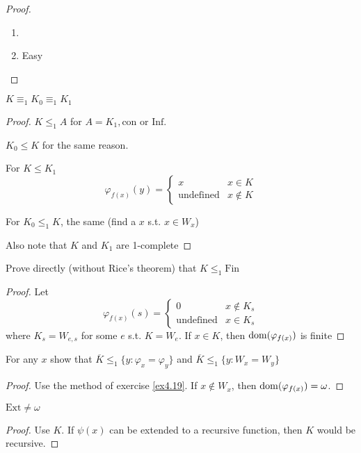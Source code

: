 \documentclass[11pt]{article}
\begin{document}
\begin{proof}
\begin{enumerate}
\item 

\item Easy
\end{enumerate}
\end{proof}

\begin{exercise}
\label{ex4.18}
\(K\equiv_1 K_0\equiv_1 K_1\)
\end{exercise}
\begin{proof}
\(K\le_1 A\) for \(A=K_1,\text{con}\) or
\(\text{Inf}\).

\(K_0\le K\) for the same reason.

For \(K\le K_1\)
\begin{equation*}
\varphi_{f(x)}(y)=
\begin{cases}
x&x\in K\\
\text{undefined}&x\not\in K
\end{cases}
\end{equation*}

For \(K_0\le_1 K\), the same (find a \(x\) s.t. \(x\in W_x\))

Also note that \(K\) and \(K_1\) are 1-complete
\end{proof}

\begin{exercise}
\label{ex4.19}
Prove directly (without Rice's theorem) that \(K\le_1\text{Fin}\)
\end{exercise}
\begin{proof}
Let
\begin{equation*}
\varphi_{f(x)}(s)=
\begin{cases}
0&x\not\in K_s\\
\text{undefined}&x\in K_s
\end{cases}
\end{equation*}
where \(K_s=W_{e,s}\) for some \(e\) s.t. \(K=W_e\). If \(x\in K\), then
\(\operatorname{dom}(\varphi_{f(x)})\) is finite
\end{proof}
\begin{exercise}
For any \(x\) show that \(\overline{K}\le_1\{y:\varphi_x=\varphi_y\}\) and
\(\overline{K}\le_1\{y:W_x=W_y\}\)
\end{exercise}
\begin{proof}
Use the method of exercise \ref{ex4.19}. If \(x\not\in W_x\), then
\(\operatorname{dom}(\varphi_{f(x)})=\omega\).
\end{proof}
\begin{exercise}
\(\text{Ext}\neq\omega\)
\end{exercise}
\begin{proof}
Use \(K\). If \(\psi(x)\) can be extended to a recursive function, then \(K\) would
be recursive.
\end{proof}
\end{document}
